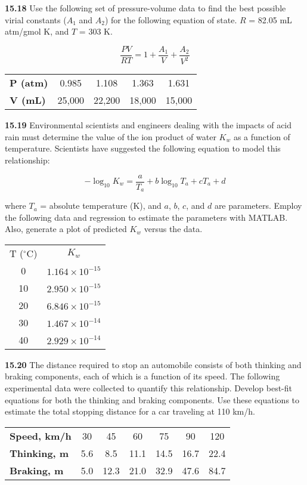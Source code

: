 \documentclass[../main.tex]{subfiles}
\begin{document}
\begin{multicols}{2}
	\noindent\textbf{15.18}  Use the following set of pressure-volume data to find
	the best possible virial constants ($A_1$ and $A_2$) for the following equation of state. $R$ = 82.05 mL atm/gmol K, and $T$ =
	 303 K.

	$$
		\frac{P V}{R T}=1 + \frac{A_1}{V}+\frac{A_2}{V^2} 
	$$
	
	\noindent
	\begin{tabular}{l c c c c }
		\textbf{P (atm)} &		0.985 &		 1.108 &		 1.363 &		 1.631 \\	 
		\textbf{V (mL)} &		 25,000 &		 22,200 &		 18,000 &		 15,000
	\end{tabular}

	\noindent\textbf{15.19} Environmental scientists and engineers dealing with
	the impacts of acid rain must determine the value of the
	ion product of water $K_w$ as a function of temperature. Scientists have suggested the following equation to model this
	relationship:

	$$
		- \log_10 K_w = \frac{a}{T_a} + b \log_10 T_a + c T_a +d
	$$

	\noindent where $T_a$ = absolute temperature (K), and $a$, $b$, $c$, and $d$ are
	parameters. Employ the following data and regression to estimate the parameters with MATLAB. Also, generate a
	plot of predicted $K_w$ versus the data.

	\noindent
	\begin{tabular}{c c}
		T ($^\circ$C) & $K_w$ \\
		0  & $1.164 \times 10^{-15}$ \\
		10 & $2.950 \times 10^{-15}$ \\
		20 & $6.846 \times 10^{-15}$ \\
		30 & $1.467 \times 10^{-14}$ \\
		40 & $2.929 \times 10^{-14}$ \\
	\end{tabular}

	\noindent\textbf{15.20} The distance required to stop an automobile consists
	of both thinking and braking components, each of which is a
	function of its speed. The following experimental data were
	collected to quantify this relationship. Develop best-fit equations for both the thinking and braking components. Use
	these equations to estimate the total stopping distance for a
	car traveling at 110 km/h.

	\begin{tabular}{l c c c c c c} 
		\textbf{Speed, km/h} &  30 &  45 &  60 &  75 &  90 &  120 \\
		\textbf{Thinking, m} &  5.6 &  8.5 &  11.1 &  14.5 &  16.7 &  22.4 \\
		\textbf{Braking, m} &  5.0 &  12.3 &  21.0 &  32.9 &  47.6 &  84.7
	\end{tabular}


\end{multicols}
\end{document}
